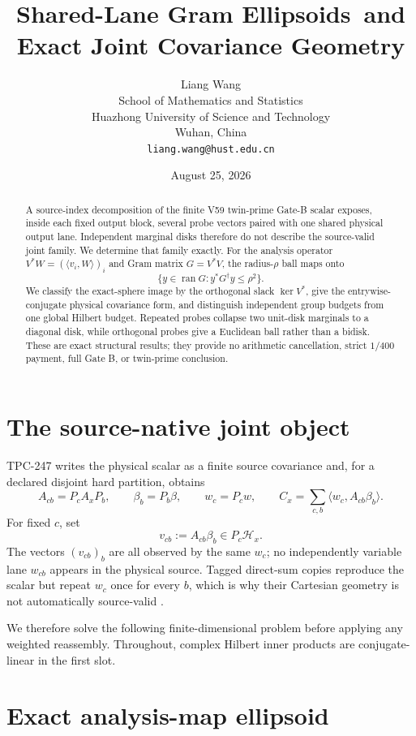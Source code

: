 \documentclass[11pt]{article}
\title{Shared-Lane Gram Ellipsoids\
and Exact Joint Covariance Geometry}
\author{Liang Wang\\
School of Mathematics and Statistics\\
Huazhong University of Science and Technology\\
Wuhan, China\\
\texttt{liang.wang@hust.edu.cn}}
\date{August 25, 2026}
\theoremstyle{remark}
\newcommand{\cH}{\mathcal H}
\newcommand{\Ran}{\operatorname{ran}}
\newcommand{\Ker}{\operatorname{ker}}
\begin{document}
\maketitle

\begin{abstract}
A source-index decomposition of the finite V59 twin-prime Gate-B scalar exposes,
inside each fixed output block, several probe vectors paired with one shared
physical output lane.  Independent marginal disks therefore do not describe
the source-valid joint family.  We determine that family exactly.  For the
analysis operator $V^*W=(\langle v_i,W\rangle)_i$ and Gram matrix $G=V^*V$,
the radius-$\rho$ ball maps onto
\[
 \{y\in\Ran G:y^*G^\dagger y\leq \rho^2\}.
\]
We classify the exact-sphere image by the orthogonal slack $\Ker V^*$, give the
entrywise-conjugate physical covariance form, and distinguish independent
group budgets from one global Hilbert budget.  Repeated probes collapse two
unit-disk marginals to a diagonal disk, while orthogonal probes give a Euclidean
ball rather than a bidisk.  These are exact structural results; they provide no
arithmetic cancellation, strict $1/400$ payment, full Gate B, or twin-prime
conclusion.
\end{abstract}

\section{The source-native joint object}

TPC-247 writes the physical scalar as a finite source covariance and, for a
declared disjoint hard partition, obtains
\[
 A_{cb}=P_cA_xP_b,\qquad \beta_b=P_b\beta,\qquad w_c=P_cw,
 \qquad
 C_x=\sum_{c,b}\langle w_c,A_{cb}\beta_b\rangle.
\]
For fixed $c$, set
\[
 v_{cb}:=A_{cb}\beta_b\in P_c\cH_x.
\]
The vectors $(v_{cb})_b$ are all observed by the same $w_c$; no independently
variable lane $w_{cb}$ appears in the physical source.  Tagged direct-sum
copies reproduce the scalar but repeat $w_c$ once for every $b$, which is why
their Cartesian geometry is not automatically source-valid
\cite{tpc247,tpc246}.

We therefore solve the following finite-dimensional problem before applying
any weighted reassembly.  Throughout, complex Hilbert inner products are
conjugate-linear in the first slot.

\section{Exact analysis-map ellipsoid}
\end{document}
